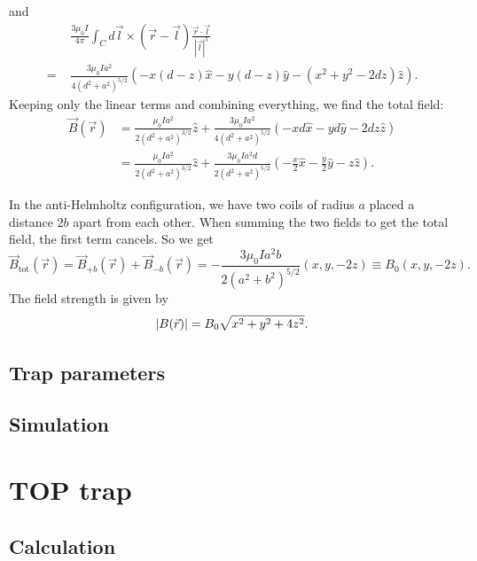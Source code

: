 \documentclass{article}
\theoremstyle{definition}
\newcommand{\f}[2]{\frac{#1}{#2}}
\begin{document}
and 
\begin{align*}
&\f{3\mu_0 I }{4\pi}\int_C d\vec{l}\times (\vec{r} - \vec{l}) \f{\vec{r}\cdot \vec{l}}{|\vec{l}|^5}\\ 
=\,\, &\f{3\mu_0 Ia^2}{4(d^2+a^2)^{5/2}} \left(- x(d-z)\hat{x}  - y (d-z)\hat{y} -  (x^2 + y^2 - 2dz)\hat{z}\right).
\end{align*}
Keeping only the linear terms and combining everything, we find the total field:
\begin{align*}
\vec{B}(\vec{r}) &= \f{\mu_0 I a^2}{2(d^2 + a^2)^{3/2}} \hat{z} + \f{3\mu_0 Ia^2}{4(d^2+a^2)^{5/2}} \left(- xd\hat{x}  -  y d\hat{y} - 2dz\hat{z}\right)\\
&= \f{\mu_0 I a^2}{2(d^2 + a^2)^{3/2}} \hat{z} + \f{3\mu_0 Ia^2 d}{2(d^2+a^2)^{5/2}} \left(- \f{x}{2}\hat{x}  -  \f{y}{2}\hat{y} - z\hat{z}\right).
\end{align*}






In the anti-Helmholtz configuration, we have two coils of radius $a$ placed a distance $2b$ apart from each other. When summing the two fields to get the total field, the first term cancels. So we get
\begin{equation*}
\vec{B}_\text{tot}(\vec{r}) = \vec{B}_{+b}(\vec{r}) + \vec{B}_{-b}(\vec{r}) = -\f{3\mu_0 I a^2 b}{2(a^2 + b^2)^{5/2}}\left( x,y,-2z \right) \equiv B_0 (x,y,-2z).
\end{equation*}
The field strength is given by 
\begin{equation*}
\abs{B(\vec{r})} = B_0 \sqrt{x^2 + y^2 + 4z^2}.
\end{equation*}



\subsection{Trap parameters}

\subsection{Simulation}




\newpage

\section{TOP trap}


\subsection{Calculation}
\end{document}
